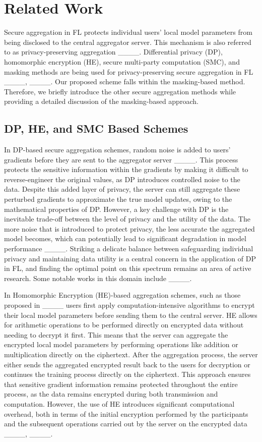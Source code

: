 \section{Related Work}
\label{sec:related-work}
Secure aggregation in FL protects individual users' local model parameters from being disclosed to the central aggregator server. This mechanism is also referred to as privacy-preserving aggregation ____. Differential privacy (DP), homomorphic encryption (HE), secure multi-party computation (SMC), and masking methods are being used for privacy-preserving secure aggregation in FL ____, ____. Our proposed scheme falls within the masking-based method. Therefore, we briefly introduce the other secure aggregation methods while providing a detailed discussion of the masking-based approach.  
\subsection{DP, HE, and SMC Based Schemes}
In DP-based secure aggregation schemes, random noise is added to users' gradients before they are sent to the aggregator server ____. This process protects the sensitive information within the gradients by making it difficult to reverse-engineer the original values, as DP introduces controlled noise to the data. Despite this added layer of privacy, the server can still aggregate these perturbed gradients to approximate the true model updates, owing to the mathematical properties of DP. However, a key challenge with DP is the inevitable trade-off between the level of privacy and the utility of the data. The more noise that is introduced to protect privacy, the less accurate the aggregated model becomes, which can potentially lead to significant degradation in model performance ____. 
Striking a delicate balance between safeguarding individual privacy and maintaining data utility is a central concern in the application of DP in FL, and finding the optimal point on this spectrum remains an area of active research. Some notable works in this domain include ____.
\par 
In Homomorphic Encryption (HE)-based aggregation schemes, such as those proposed in ____ users first apply computation-intensive algorithms to encrypt their local model parameters before sending them to the central server.
HE allows for arithmetic operations to be performed directly on encrypted data without needing to decrypt it first. This means that the server can aggregate the encrypted local model parameters by performing operations like addition or multiplication directly on the ciphertext. After the aggregation process, the server either sends the aggregated encrypted result back to the users for decryption or continues the training process directly on the ciphertext. This approach ensures that sensitive gradient information remains protected throughout the entire process, as the data remains encrypted during both transmission and computation. However, the use of HE introduces significant computational overhead, both in terms of the initial encryption performed by the participants and the subsequent operations carried out by the server on the encrypted data ____, ____. 

